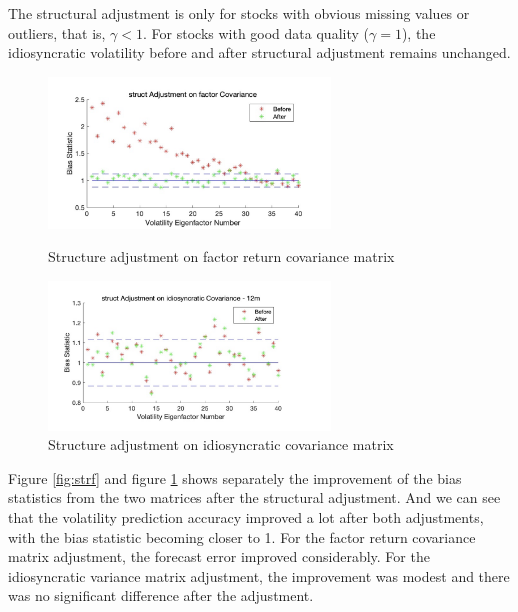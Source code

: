 \documentclass[10pt]{article}
\begin{document}
The structural adjustment is only for stocks with obvious missing values or outliers, that is, $\gamma < 1$. For stocks with good data quality ($\gamma = 1$), the idiosyncratic volatility before and after structural adjustment remains unchanged.

\begin{figure}[htbp]
\centering
\begin{minipage}[t]{0.48\textwidth}
\centering
\includegraphics[width=7.5cm]{struct on factor.png}
\caption{Structure adjustment on factor return covariance matrix}
\label{fig:strf}
\end{minipage}
\begin{minipage}[t]{0.48\textwidth}
\centering
\includegraphics[width=7.5cm]{struct on idio.png}
\caption{Structure adjustment on idiosyncratic covariance matrix}
\label{fig:stri}
\end{minipage}
\end{figure}

Figure \ref{fig:strf} and figure \ref{fig:stri} shows separately the improvement of the bias statistics from the two matrices after the structural adjustment. And we can see that the volatility prediction accuracy improved a lot after both adjustments, with the bias statistic becoming closer to 1. For the factor return covariance matrix adjustment, the forecast error improved considerably. For the idiosyncratic variance matrix adjustment, the improvement was modest and there was no significant difference after the adjustment.
\end{document}

